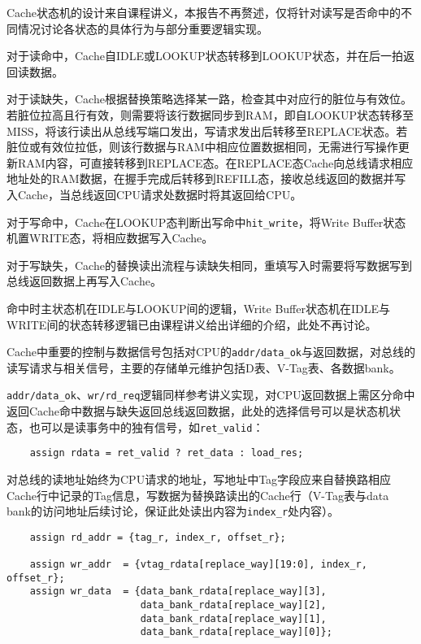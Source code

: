 \documentclass[UTF-8,twoside,c5size]{ctexart}
\begin{document}
    Cache状态机的设计来自课程讲义，本报告不再赘述，仅将针对读写是否命中的不同情况讨论各状态的具体行为与部分重要逻辑实现。
    
    对于读命中，Cache自IDLE或LOOKUP状态转移到LOOKUP状态，并在后一拍返回读数据。
    
    对于读缺失，Cache根据替换策略选择某一路，检查其中对应行的脏位与有效位。若脏位拉高且行有效，则需要将该行数据同步到RAM，即自LOOKUP状态转移至MISS，将该行读出从总线写端口发出，写请求发出后转移至REPLACE状态。若脏位或有效位拉低，则该行数据与RAM中相应位置数据相同，无需进行写操作更新RAM内容，可直接转移到REPLACE态。在REPLACE态Cache向总线请求相应地址处的RAM数据，在握手完成后转移到REFILL态，接收总线返回的数据并写入Cache，当总线返回CPU请求处数据时将其返回给CPU。
    
    对于写命中，Cache在LOOKUP态判断出写命中\texttt{hit\_write}，将Write Buffer状态机置WRITE态，将相应数据写入Cache。
    
    对于写缺失，Cache的替换读出流程与读缺失相同，重填写入时需要将写数据写到总线返回数据上再写入Cache。
    
    命中时主状态机在IDLE与LOOKUP间的逻辑，Write Buffer状态机在IDLE与WRITE间的状态转移逻辑已由课程讲义给出详细的介绍，此处不再讨论。
    
    Cache中重要的控制与数据信号包括对CPU的\texttt{addr/data\_ok}与返回数据，对总线的读写请求与相关信号，主要的存储单元维护包括D表、V-Tag表、各数据bank。
    
    \texttt{addr/data\_ok}、\texttt{wr/rd\_req}逻辑同样参考讲义实现，对CPU返回数据上需区分命中返回Cache命中数据与缺失返回总线返回数据，此处的选择信号可以是状态机状态，也可以是读事务中的独有信号，如\texttt{ret\_valid}：
    \begin{verbatim}
    assign rdata = ret_valid ? ret_data : load_res;
    \end{verbatim}
    
    对总线的读地址始终为CPU请求的地址，写地址中Tag字段应来自替换路相应Cache行中记录的Tag信息，写数据为替换路读出的Cache行（V-Tag表与data bank的访问地址后续讨论，保证此处读出内容为\texttt{index\_r}处内容）。
    \begin{verbatim}
    assign rd_addr = {tag_r, index_r, offset_r};
    
    assign wr_addr  = {vtag_rdata[replace_way][19:0], index_r, offset_r};
    assign wr_data  = {data_bank_rdata[replace_way][3],
                       data_bank_rdata[replace_way][2],
                       data_bank_rdata[replace_way][1],
                       data_bank_rdata[replace_way][0]};
    \end{verbatim}
    
\end{document}
